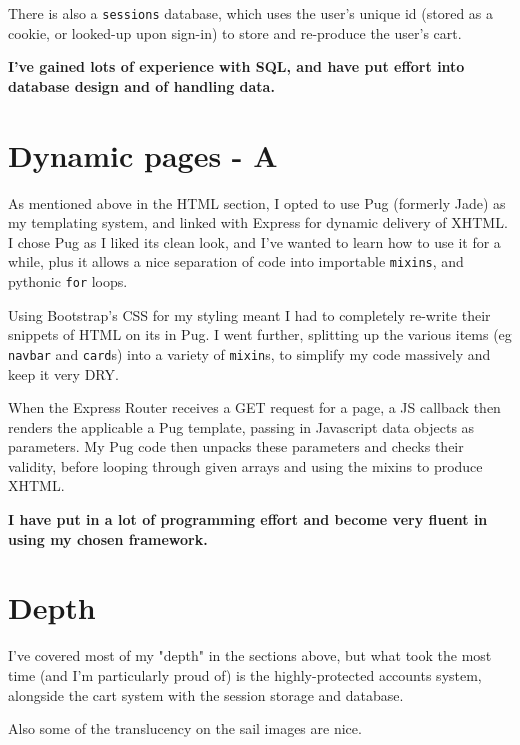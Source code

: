 \documentclass[12pt]{article}
\begin{document}
There is also a \verb|sessions| database, which uses the user's unique id (stored as a cookie, or looked-up upon sign-in) to store and re-produce the user's cart.

\textbf{ I've gained lots of experience with SQL, and have put effort into database design and of handling data.}
 
 
\section*{Dynamic pages \large\normalfont - A}
As mentioned above in the HTML section, I opted to use Pug (formerly Jade) as my templating system, and linked with Express for dynamic delivery of XHTML.
I chose Pug as I liked its clean look, and I've wanted to learn how to use it for a while, plus it allows a nice separation of code into importable \verb|mixins|, and pythonic \verb|for| loops.

Using Bootstrap's CSS for my styling meant I had to completely re-write their snippets of HTML on its in Pug. I went further, splitting up the various items (eg \verb|navbar| and \verb|card|s) into a variety of \verb|mixin|s, to simplify my code massively and keep it very DRY.

When the Express Router receives a GET request for a page, a JS callback then renders the applicable a Pug template, passing in Javascript data objects as parameters. 
My Pug code then unpacks these parameters and checks their validity, before looping through given arrays and using the mixins to produce XHTML.

\textbf{I have put in a lot of programming effort and become very fluent in using my chosen framework.}


\section*{Depth}
I've covered most of my "depth" in the sections above, but what took the most time (and I'm particularly proud of) is the highly-protected accounts system, alongside the cart system with the session storage and database.

Also some of the translucency on the sail images are nice.
\end{document}
